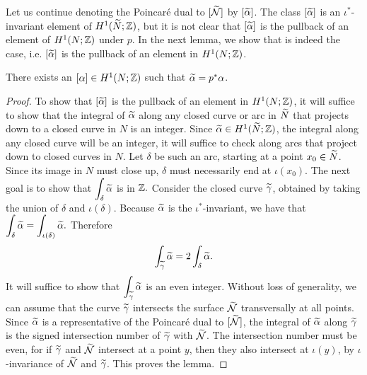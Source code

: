 Let us continue denoting the Poincar\'e dual to $[\widetilde{\mathcal{N}}]$ by $[\widetilde{\alpha}]$.  The class $[\widetilde{\alpha}]$ is an $\iota^{\ast}$-invariant element of $H^1(\widetilde{N}; \mathbb{Z})$, but it is not clear that $[\widetilde{\alpha}]$ is the pullback of an element of $H^1(N; \mathbb{Z})$ under $p$.
In the next lemma, we show that is indeed the case, i.e. $[\widetilde{\alpha}]$ is the pullback of an element in $H^1(N; \mathbb{Z})$.
\begin{lem}
  \label{lem:PD2}
  There exists an $[\alpha] \in H^1(N; \mathbb{Z})$ such that $\widetilde{\alpha} = p^{\ast} \alpha$.
\end{lem}
\begin{proof}
  To show that $[\widetilde{\alpha}]$ is the pullback of an element in $H^1(N; \mathbb{Z})$, it will suffice to show that the integral of $\widetilde{\alpha}$ along any closed curve or arc in $\widetilde{N}$ that projects down to a closed curve in $N$ is an integer.
  Since $\widetilde{\alpha} \in H^1(\widetilde{N}; \mathbb{Z})$, the integral along any closed curve will be an integer, it will suffice to check along arcs that project down to closed curves in $N$.
  Let $\delta$ be such an arc, starting at a point $x_0 \in \widetilde{N}$.
  Since its image in $N$ must close up, $\delta$ must necessarily end at $\iota(x_0)$.
  The next goal is to show that
    $\displaystyle\int_{\delta} \widetilde{\alpha}$ is in $\mathbb{Z}.$
  Consider the closed curve $\widetilde{\gamma}$, obtained by taking the union of $\delta$ and $\iota(\delta)$.
  Because $\widetilde{\alpha}$ is the $\iota^{\ast}$-invariant, we have that $ \displaystyle\int_{\delta} \widetilde{\alpha} = \displaystyle\int_{\iota(\delta)} \widetilde{\alpha}.$  Therefore $$\int_{\widetilde{\gamma}}\widetilde{\alpha}=2\int_{\delta}\widetilde{\alpha}.$$ It will suffice to show that $\displaystyle\int_{\widetilde{\gamma}}\widetilde{\alpha}$ is an even integer.
  Without loss of generality, we can assume that the curve $\widetilde{\gamma}$ intersects the surface $\widetilde{\mathcal{N}}$ transversally at all points.
  Since $\widetilde{\alpha}$ is a representative of the Poincar\'e dual to $[\widetilde{\mathcal{N}}]$, the integral of $\widetilde{\alpha}$ along $\widetilde{\gamma}$ is the signed intersection number of $\widetilde{\gamma}$ with $\widetilde{\mathcal{N}}$.
  The intersection number must be even, for if $\widetilde{\gamma}$ and $\widetilde{\mathcal{N}}$ intersect at a point $y$, then they also intersect at $\iota(y)$, by $\iota$-invariance of $\widetilde{\mathcal{N}}$ and $\widetilde{\gamma}$. This proves the lemma.
\end{proof}
